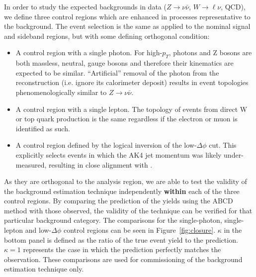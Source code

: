 
In order to study the expected backgrounds in data ($Z\rightarrow\nu\bar{\nu}$, $W\rightarrow\ell\nu$, QCD), we define three control regions which are enhanced in processes representative to the background. The event selection is the same as applied to the nominal signal and sideband regions, but with some defining orthogonal condition:

\begin{itemize}

\item A control region with a single photon. For high-$p_{T}$, photons and Z bosons are both massless, neutral, gauge bosons and therefore their kinematics are expected to be similar.  ``Artificial'' removal of the photon from the reconstruction (i.e. ignore its calorimeter deposit) results in event topologies phenomenologically similar to $Z\rightarrow\nu\bar{\nu}$.

\item A control region with a single lepton. The topology of events from direct W or top quark production is the same regardless if the electron or muon is identified as such. 

\item A control region defined by the logical inversion of the low-$\Delta\phi$ cut. This explicitly selects events in which the AK4 jet momentum was likely under-measured, resulting in close alignment with \ptmiss.

\end{itemize}

As they are orthogonal to the analysis region, we are able to test the validity of the background estimation technique independently \textbf{within} each of the three control regions. By comparing the prediction of the yields using the ABCD method with those observed, the validity of the technique can be verified for that particular background category. The comparisons for the single-photon, single-lepton and low-$\Delta\phi$ control regions can be seen in Figure~\ref{fig:closure}. $\kappa$ in the bottom panel is defined as the ratio of the true event yield to the prediction. $\kappa=1$ represents the case in which the prediction perfectly matches the observation. These comparisons are used for commissioning of the background estimation technique only.

